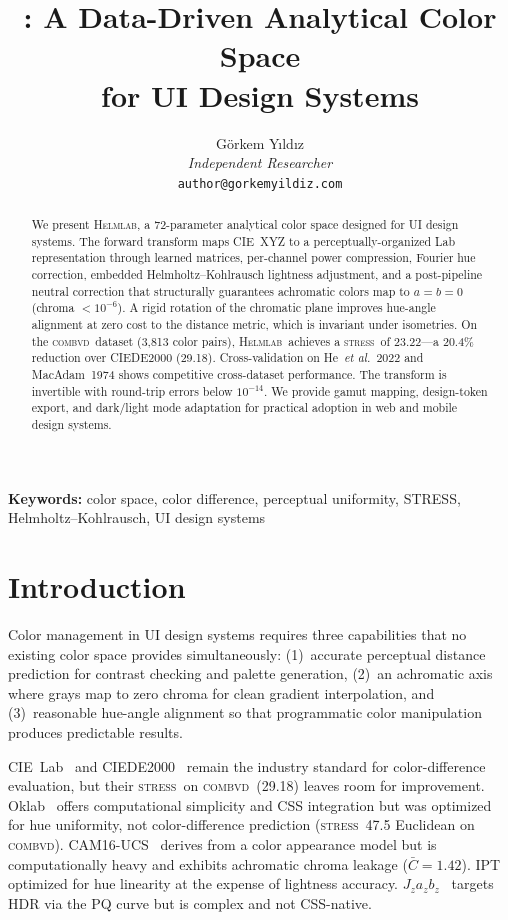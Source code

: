 \documentclass[11pt, twocolumn]{article}
\title{\helmlab: A Data-Driven Analytical Color Space\\for UI Design Systems}
\author{
  G\"orkem Y{\i}ld{\i}z\\
  \textit{Independent Researcher}\\
  \texttt{author@gorkemyildiz.com}
}
\date{}
\newcommand{\helmlab}{\textsc{Helmlab}}
\newcommand{\stress}{\textsc{stress}}
\newcommand{\combvd}{\textsc{combvd}}
\newcommand{\etal}{\textit{et al.}}
\begin{document}
\maketitle

\begin{abstract}
We present \helmlab, a 72-parameter analytical color space designed for
UI design systems. The forward transform maps CIE~XYZ to a
perceptually-organized Lab representation through learned matrices,
per-channel power compression, Fourier hue correction, embedded
Helmholtz--Kohlrausch lightness adjustment, and a post-pipeline neutral
correction that structurally guarantees achromatic colors map to
$a\!=\!b\!=\!0$ (chroma $<10^{-6}$). A rigid rotation of the
chromatic plane improves hue-angle alignment at zero cost to the
distance metric, which is invariant under isometries. On the
\combvd\ dataset (3{,}813 color pairs), \helmlab\ achieves a
\stress\ of 23.22---a 20.4\% reduction over CIEDE2000 (29.18). Cross-validation on He~\etal\
2022 and MacAdam~1974 shows competitive cross-dataset performance. The transform is
invertible with round-trip errors below $10^{-14}$.
We provide gamut mapping, design-token export, and dark/light mode
adaptation for practical adoption in web and mobile design systems.
\end{abstract}

\textbf{Keywords:} color space, color difference, perceptual uniformity, STRESS, Helmholtz--Kohlrausch, UI design systems


\section{Introduction}
\label{sec:intro}

Color management in UI design systems requires three capabilities that
no existing color space provides simultaneously: (1)~accurate perceptual
distance prediction for contrast checking and palette generation,
(2)~an achromatic axis where grays map to zero chroma for clean gradient
interpolation, and (3)~reasonable hue-angle alignment so that
programmatic color manipulation produces predictable results.

CIE~Lab~\cite{cie1976} and CIEDE2000~\cite{luo2001} remain the
industry standard for color-difference evaluation, but their
\stress\ on \combvd\ (29.18) leaves room for improvement.
Oklab~\cite{ottosson2020} offers computational simplicity and CSS
integration but was optimized for hue uniformity, not color-difference
prediction (\stress\ 47.5 Euclidean on \combvd). CAM16-UCS~\cite{li2017} derives from
a color appearance model but is computationally heavy and exhibits
achromatic chroma leakage ($\bar{C}=1.42$). IPT~\cite{ebner1998}
optimized for hue linearity at the expense of lightness accuracy.
$J_z a_z b_z$~\cite{safdar2017} targets HDR via the PQ curve but
is complex and not CSS-native.
\end{document}
